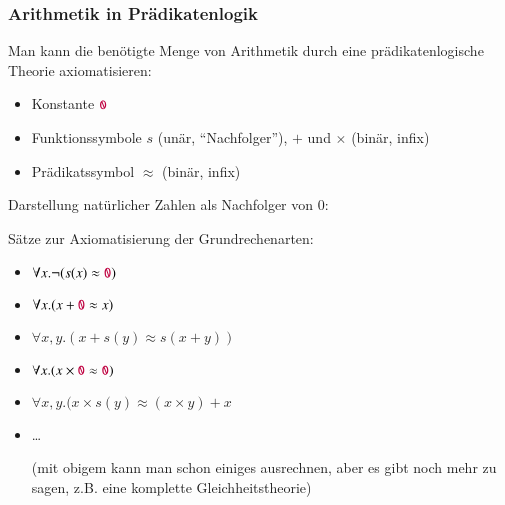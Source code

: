 \documentclass[aspectratio=1610,onlymath]{beamer}
\begin{document}
\begin{frame}\frametitle{Arithmetik in Prädikatenlogik}

Man kann die benötigte Menge von Arithmetik durch eine prädikatenlogische Theorie axiomatisieren:
\begin{itemize}
\item Konstante $\mathtt{\textcolor{purple}{0}}$
\item Funktionssymbole $s$ (unär, "`Nachfolger"'), $+$ und $\times$ (binär, infix)
\item Prädikatssymbol $\approx$ (binär, infix)
\end{itemize}

Darstellung natürlicher Zahlen als Nachfolger von 0:\\[0.5ex]
\bigskip

Sätze zur Axiomatisierung der Grundrechenarten:
\begin{itemize}
\item $\forall x.\neg(s(x)\approx \mathtt{\textcolor{purple}{0}})$
\item $\forall x.(x+\mathtt{\textcolor{purple}{0}}\approx x)$ 
\item $\forall x,y.(x+s(y)\approx s(x+y))$
\item $\forall x.(x\times \mathtt{\textcolor{purple}{0}}\approx \mathtt{\textcolor{purple}{0}})$ 
\item $\forall x,y.(x\times s(y)\approx (x\times y)+x$
\item \ldots {\tiny (mit obigem kann man schon einiges ausrechnen, aber es gibt noch mehr zu sagen, z.B. eine komplette Gleichheitstheorie)

}
\end{itemize}

\end{frame}

\end{document}

